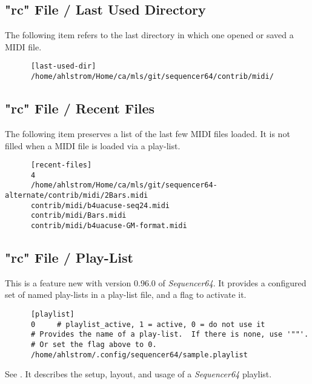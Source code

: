 \subsection{"rc" File / Last Used Directory}
\label{subsec:seq64_rc_file_last_used_dir}

   The following item refers to the last directory in which one opened or
   saved a MIDI file.

   \begin{verbatim}
      [last-used-dir]
      /home/ahlstrom/Home/ca/mls/git/sequencer64/contrib/midi/
   \end{verbatim}

\subsection{"rc" File / Recent Files}
\label{subsec:seq64_rc_file_recent_files}

   The following item preserves a list of the last few MIDI files loaded.
   It is not filled when a MIDI file is loaded via a play-list.

   \begin{verbatim}
      [recent-files]
      4
      /home/ahlstrom/Home/ca/mls/git/sequencer64-alternate/contrib/midi/2Bars.midi
      contrib/midi/b4uacuse-seq24.midi
      contrib/midi/Bars.midi
      contrib/midi/b4uacuse-GM-format.midi
   \end{verbatim}

\subsection{"rc" File / Play-List}
\label{subsec:seq64_rc_file_playlist}

   This is a feature new with version 0.96.0 of \textsl{Sequencer64}.
   It provides a configured set of named play-lists in a play-list file,
   and a flag to activate it.
   
   \index{[playlist]}
   \begin{verbatim}
      [playlist]
      0     # playlist_active, 1 = active, 0 = do not use it
      # Provides the name of a play-list.  If there is none, use '""'.
      # Or set the flag above to 0.
      /home/ahlstrom/.config/sequencer64/sample.playlist
   \end{verbatim}

   See .
   It describes the setup, layout, and usage of a
   \textsl{Sequencer64} playlist.

